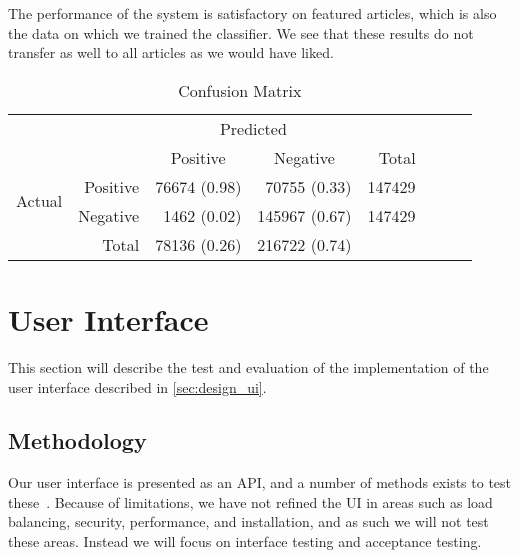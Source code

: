 The performance of the system is satisfactory on featured articles, which is also the data on which we trained the classifier. We see that these results do not transfer as well to all articles as we would have liked.



\begin{table}[tbp]
    \centering
     \begin{tabular}{rrrrrrrr}
      \toprule
      \multicolumn{2}{c}{} & \multicolumn{2}{c}{Predicted} & \\
      \cmidrule{3-4}
      \multicolumn{2}{c}{} & \multicolumn{1}{c}{Positive} & \multicolumn{1}{c}{Negative} & Total \\
      \midrule
      \multirow{2}{*}{Actual} & Positive & \num{76674} (0.98) & \num{70755} (0.33)  & \num{147429} \\
                              & Negative & \num{1462} (0.02)  & \num{145967} (0.67) & \num{147429} \\
                              \cmidrule{1-2}
                              & Total    & \num{78136} (0.26) & \num{216722} (0.74) \\
      \bottomrule
    \end{tabular}
    \caption[Confusion Matrix]{Confusion Matrix}%
    \label{tab:confusionmatrix}
\end{table}

\section{User Interface}
This section will describe the test and evaluation of the implementation of the user interface described in \cref{sec:design_ui}.

\subsection{Methodology}
Our user interface is presented as an API, and a number of methods exists to test these~\cite{swebok}. Because of limitations, we have not refined the UI in areas such as load balancing, security, performance, and installation, and as such we will not test these areas. Instead we will focus on interface testing and acceptance testing.

